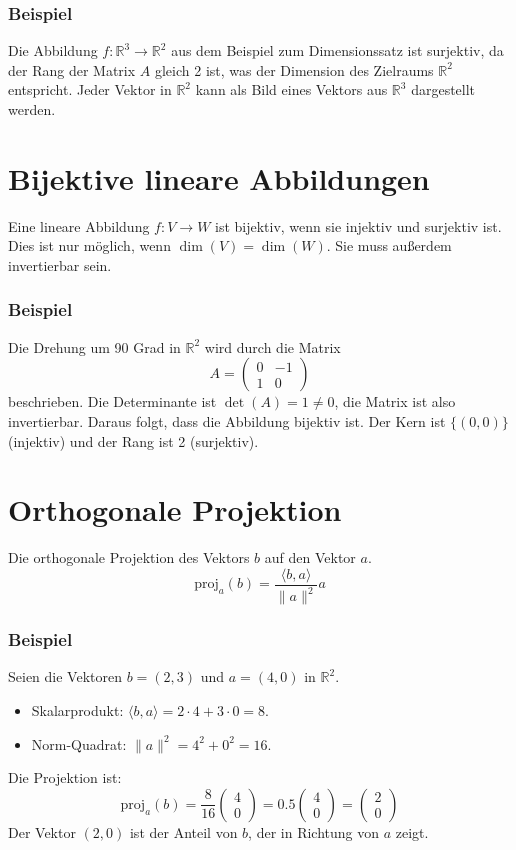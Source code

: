 \subsubsection{Beispiel}
Die Abbildung \(f: \mathbb{R}^3 \to \mathbb{R}^2\) aus dem Beispiel zum
Dimensionssatz ist surjektiv, da der Rang der Matrix \(A\) gleich 2 ist, was
der Dimension des Zielraums \(\mathbb{R}^2\) entspricht. Jeder Vektor in
\(\mathbb{R}^2\) kann als Bild eines Vektors aus \(\mathbb{R}^3\) dargestellt
werden.

\section{Bijektive lineare Abbildungen}
Eine lineare Abbildung \(f: V \to W\) ist bijektiv, wenn sie injektiv und
surjektiv ist. Dies ist nur möglich, wenn \(\dim(V) = \dim(W)\). Sie muss
außerdem invertierbar sein.

\subsubsection{Beispiel}
Die Drehung um 90 Grad in \(\mathbb{R}^2\) wird durch die Matrix
\[
    A = \begin{pmatrix} 0 & -1 \\ 1 & 0 \end{pmatrix}
\]
beschrieben. Die Determinante ist \(\det(A) = 1 \neq 0\), die Matrix ist also
invertierbar. Daraus folgt, dass die Abbildung bijektiv ist. Der Kern ist
\(\{(0,0)\}\) (injektiv) und der Rang ist 2 (surjektiv).

\section{Orthogonale Projektion}
Die orthogonale Projektion des Vektors \(b\) auf den Vektor \(a\).
\[
    \mathrm{proj}_{a}(b) = \frac{\langle b, a \rangle}{\|a\|^2} a
\]

\subsubsection{Beispiel}
Seien die Vektoren \(b = (2, 3)\) und \(a = (4, 0)\) in \(\mathbb{R}^2\).
\begin{itemize}
    \item Skalarprodukt: \(\langle b, a \rangle = 2 \cdot 4 + 3 \cdot 0 = 8\).
    \item Norm-Quadrat: \(\|a\|^2 = 4^2 + 0^2 = 16\).
\end{itemize}
Die Projektion ist:
\[
    \mathrm{proj}_{a}(b) = \frac{8}{16} \begin{pmatrix} 4 \\ 0 \end{pmatrix} = 0.5 \begin{pmatrix} 4 \\ 0 \end{pmatrix} = \begin{pmatrix} 2 \\ 0 \end{pmatrix}
\]
Der Vektor \((2,0)\) ist der Anteil von \(b\), der in Richtung von \(a\) zeigt.

